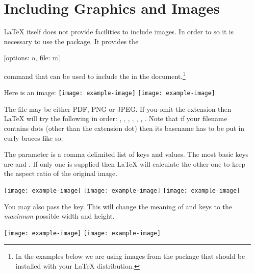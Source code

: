 \section{Including Graphics and Images}\label{sec:images}

\LaTeX{} itself does not provide facilities to include images. In order to so
it is necessary to use the  package. It provides the
\begin{lscommand}
  [options: o, file: m]
\end{lscommand}
command that can be used to include the  in the
document.\footnote{In the examples below we are using images from the
   package that should be installed with your \LaTeX{} distribution.}
\begin{example}
Here is an image:
\texttt{[image: example-image]}
\texttt{[image: example-image]}%
\end{example}
The file may be either PDF, PNG or JPEG\@. If you omit the extension then
\LaTeX{} will try the following in order: , , ,
, , , . Note that if your filename
contains dots (other than the extension dot) then its basename has to be put in
curly braces like so:
\begin{code}
  \texttt|\texttt{[image: \{image.with.dots]}.jpg}|
\end{code}

The  parameter is a comma delimited list of keys and values. The
most basic keys are  and . If only one is supplied
then \LaTeX{} will calculate the other one to keep the aspect ratio of the
original image.
\begin{example}[examplewidth=0.85\linewidth, vertical_mode]
\texttt{[image: example-image]}
\texttt{[image: example-image]}
\texttt{[image: example-image]}
\end{example}

You may also pass the  key. This will change the meaning
of  and  keys to the \emph{maximum} possible width
and height.
\begin{example}[examplewidth=0.6\linewidth]
\texttt{[image: example-image]}
\texttt{[image: example-image]}
\end{example}

